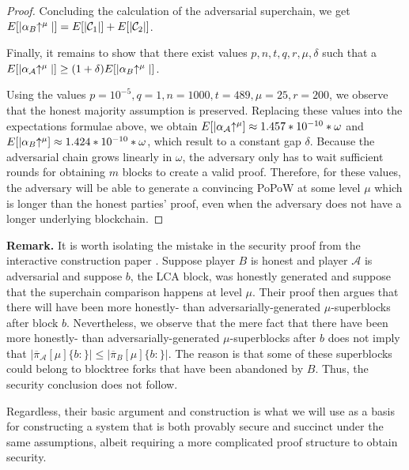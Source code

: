\begin{proof}
Concluding the calculation of the adversarial superchain, we get
$E[|\alpha_B\negthickspace\uparrow^\mu|] = E[|\mathcal{C}_1|] + E[|\mathcal{C}_2|]$.

Finally, it remains to show that there exist values $p, n, t, q, r, \mu, \delta$
such that a $E[|\alpha_\mathcal{A}\negthickspace\uparrow^\mu|] \geq (1 +
\delta)E[|\alpha_B\negthickspace\uparrow^\mu|]$.

Using the values $p = 10^{-5}, q = 1, n =
1000, t = 489, \mu = 25, r = 200$, we observe that the honest majority
assumption is preserved. Replacing these values into the expectations formulae
above, we obtain $E[|\alpha_\mathcal{A}\negthickspace\uparrow^\mu] \approx 1.457 * 10^{-10} *
\omega$ and $E[|\alpha_B\negthickspace\uparrow^\mu] \approx 1.424 * 10^{-10} * \omega$, which
result to a constant gap $\delta$. Because the adversarial chain grows linearly
in $\omega$, the adversary only has to wait sufficient rounds for obtaining $m$
blocks to create a valid proof. Therefore, for these values, the adversary
will be able to generate a convincing PoPoW at some level $\mu$ which is longer
than the honest parties' proof, even when the adversary does not have a longer
underlying blockchain.
\Qed
\end{proof}

\textbf{Remark.} It is worth isolating the mistake in the security proof from
the interactive construction paper \cite{KLS}. Suppose player $B$ is honest and
player $\mathcal{A}$ is adversarial and suppose $b$, the LCA block, was honestly
generated and suppose that the superchain comparison happens at level $\mu$.
Their proof then argues that there will have been more honestly- than
adversarially-generated $\mu$-superblocks after block $b$. Nevertheless, we
observe that the mere fact that there have been more honestly- than
adversarially-generated $\mu$-superblocks after $b$ does not imply that
$|\overline\pi_\mathcal{A}[\mu]\{b:\}| \leq |\overline\pi_B[\mu]\{b:\}|$. The
reason is that some of these superblocks could belong to blocktree forks that
have been abandoned by $B$. Thus, the security conclusion does not follow.

Regardless, their basic argument and construction is what we will use as a basis
for constructing a system that is both provably secure and succinct under the
same assumptions, albeit requiring a more complicated proof structure to obtain
security.

